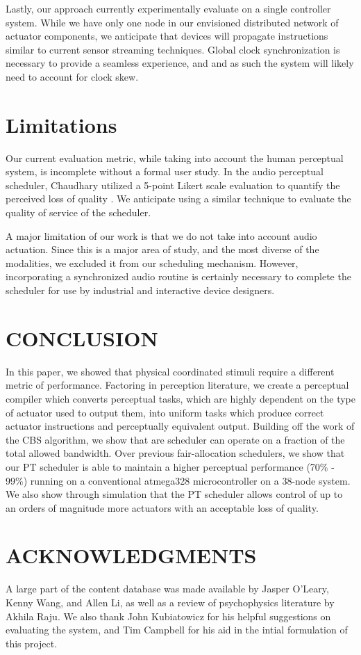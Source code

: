 \documentclass{sigchi}
\begin{document}
  Lastly, our approach currently experimentally evaluate on a single controller system. While we have only one node in our envisioned distributed network of actuator components, we anticipate that devices will propagate instructions similar to current sensor streaming techniques. Global clock synchronization is necessary to provide a seamless experience, and and as such the system will likely need to account for clock skew. 

 \section{Limitations}
  Our current evaluation metric, while taking into account the human perceptual system, is incomplete without a formal user study. In the audio perceptual scheduler, Chaudhary utilized a 5-point Likert scale evaluation to quantify the perceived loss of quality \cite{chaudhary_perceptual_2001}. We anticipate using a similar technique to evaluate the quality of service of the scheduler. 

  A major limitation of our work is that we do not take into account audio actuation. Since this is a major area of study, and the most diverse of the modalities, we excluded it from our scheduling mechanism. However, incorporating a synchronized audio routine is certainly necessary to complete the scheduler for use by industrial and interactive device designers.


  \section{CONCLUSION}
  In this paper, we showed that physical coordinated stimuli require a different metric of performance. Factoring in perception literature, we create a perceptual compiler which converts perceptual tasks, which are highly dependent on the type of actuator used to output them, into uniform tasks which produce correct actuator instructions and perceptually equivalent output. Building off the work of the CBS algorithm, we show that are scheduler can operate on a fraction of the total allowed bandwidth.  Over previous fair-allocation schedulers, we show that our PT scheduler is able to maintain a higher perceptual performance (70\% - 99\%) running on a conventional atmega328 microcontroller on a 38-node system. We also show through simulation that the PT scheduler allows control of up to an orders of magnitude more actuators with an acceptable loss of quality. 


  \section{ACKNOWLEDGMENTS}
  A large part of the content database was made available by Jasper O'Leary, Kenny Wang, and Allen Li, as well as a review of psychophysics literature by Akhila Raju. We also thank John Kubiatowicz for his helpful suggestions on evaluating the system, and Tim Campbell for his aid in the intial formulation of this project.  


\end{document}
